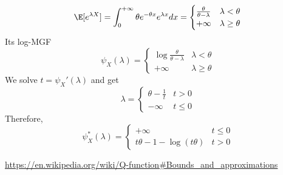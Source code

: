 \documentclass{article}
\begin{document}
\begin{enumerate}
\begin{enumerate}
    \begin{equation*}
    \E[e^{\lambda X}] = \int_0^{+\infty}
    \theta e^{-\theta x}e^{\lambda x}dx
    =
    \begin{cases}
    \frac{\theta}{\theta - \lambda} & \lambda < \theta \\
    +\infty & \lambda \geq \theta
    \end{cases}
    \end{equation*}
Its log-MGF 
 \begin{equation*}
 \psi_X(\lambda)=
 \begin{cases}
 \log\frac{\theta}{\theta - \lambda} & \lambda < \theta \\
    +\infty & \lambda \geq \theta
  \end{cases}
 \end{equation*}
     We solve
    $t=\psi_X'(\lambda)$ and get
    \begin{equation*}
    \lambda = \begin{cases}\theta - \frac{1}{t} & t > 0
    \\
    -\infty & t \leq 0
    \end{cases}
 \end{equation*} Therefore,
    \begin{equation*}
 \psi^*_X(\lambda)=
 \begin{cases}
+\infty & t \leq 0 \\
    t\theta - 1 -\log(t\theta) & t >0
  \end{cases}
 \end{equation*}
    
\end{enumerate}

\end{enumerate}
\begin{thebibliography}{9}
 \url{https://en.wikipedia.org/wiki/Q-function#Bounds_and_approximations}
\end{thebibliography}
\end{document}
